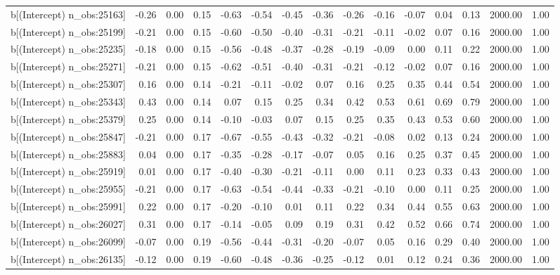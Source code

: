\begin{table}[ht]
\begin{tabular}{rrrrrrrrrrrrrrr}
  b[(Intercept) n\_obs:25163] & -0.26 & 0.00 & 0.15 & -0.63 & -0.54 & -0.45 & -0.36 & -0.26 & -0.16 & -0.07 & 0.04 & 0.13 & 2000.00 & 1.00 \\ 
  b[(Intercept) n\_obs:25199] & -0.21 & 0.00 & 0.15 & -0.60 & -0.50 & -0.40 & -0.31 & -0.21 & -0.11 & -0.02 & 0.07 & 0.16 & 2000.00 & 1.00 \\ 
  b[(Intercept) n\_obs:25235] & -0.18 & 0.00 & 0.15 & -0.56 & -0.48 & -0.37 & -0.28 & -0.19 & -0.09 & 0.00 & 0.11 & 0.22 & 2000.00 & 1.00 \\ 
  b[(Intercept) n\_obs:25271] & -0.21 & 0.00 & 0.15 & -0.62 & -0.51 & -0.40 & -0.31 & -0.21 & -0.12 & -0.02 & 0.07 & 0.16 & 2000.00 & 1.00 \\ 
  b[(Intercept) n\_obs:25307] & 0.16 & 0.00 & 0.14 & -0.21 & -0.11 & -0.02 & 0.07 & 0.16 & 0.25 & 0.35 & 0.44 & 0.54 & 2000.00 & 1.00 \\ 
  b[(Intercept) n\_obs:25343] & 0.43 & 0.00 & 0.14 & 0.07 & 0.15 & 0.25 & 0.34 & 0.42 & 0.53 & 0.61 & 0.69 & 0.79 & 2000.00 & 1.00 \\ 
  b[(Intercept) n\_obs:25379] & 0.25 & 0.00 & 0.14 & -0.10 & -0.03 & 0.07 & 0.15 & 0.25 & 0.35 & 0.43 & 0.53 & 0.60 & 2000.00 & 1.00 \\ 
  b[(Intercept) n\_obs:25847] & -0.21 & 0.00 & 0.17 & -0.67 & -0.55 & -0.43 & -0.32 & -0.21 & -0.08 & 0.02 & 0.13 & 0.24 & 2000.00 & 1.00 \\ 
  b[(Intercept) n\_obs:25883] & 0.04 & 0.00 & 0.17 & -0.35 & -0.28 & -0.17 & -0.07 & 0.05 & 0.16 & 0.25 & 0.37 & 0.45 & 2000.00 & 1.00 \\ 
  b[(Intercept) n\_obs:25919] & 0.01 & 0.00 & 0.17 & -0.40 & -0.30 & -0.21 & -0.11 & 0.00 & 0.11 & 0.23 & 0.33 & 0.43 & 2000.00 & 1.00 \\ 
  b[(Intercept) n\_obs:25955] & -0.21 & 0.00 & 0.17 & -0.63 & -0.54 & -0.44 & -0.33 & -0.21 & -0.10 & 0.00 & 0.11 & 0.25 & 2000.00 & 1.00 \\ 
  b[(Intercept) n\_obs:25991] & 0.22 & 0.00 & 0.17 & -0.20 & -0.10 & 0.01 & 0.11 & 0.22 & 0.34 & 0.44 & 0.55 & 0.63 & 2000.00 & 1.00 \\ 
  b[(Intercept) n\_obs:26027] & 0.31 & 0.00 & 0.17 & -0.14 & -0.05 & 0.09 & 0.19 & 0.31 & 0.42 & 0.52 & 0.66 & 0.74 & 2000.00 & 1.00 \\ 
  b[(Intercept) n\_obs:26099] & -0.07 & 0.00 & 0.19 & -0.56 & -0.44 & -0.31 & -0.20 & -0.07 & 0.05 & 0.16 & 0.29 & 0.40 & 2000.00 & 1.00 \\ 
  b[(Intercept) n\_obs:26135] & -0.12 & 0.00 & 0.19 & -0.60 & -0.48 & -0.36 & -0.25 & -0.12 & 0.01 & 0.12 & 0.24 & 0.36 & 2000.00 & 1.00 \\ 

\end{tabular}
\end{table}

